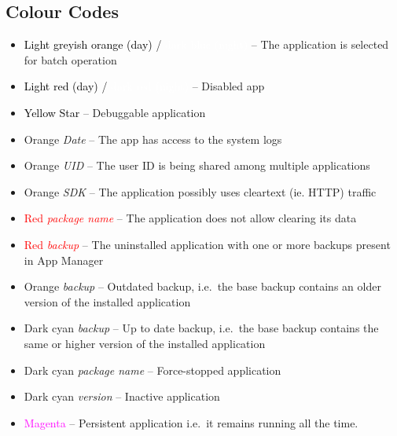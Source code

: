 \subsection{Colour Codes}\label{subsec:main-colour-codes} %
\begin{itemize}
    \item \colorbox{AMLightGreyishOrange}{\textcolor{black}{Light greyish orange (day)}} / \colorbox{AMDarkBlue}{
        \textcolor{white}{dark blue (night)}} -- The application is selected for batch operation
    \item \colorbox{AMLightRed}{\textcolor{black}{Light red (day)}} / \colorbox{AMVeryDarkRed}{\textcolor{white}
    {dark red (night)}} -- Disabled app
    \item \colorbox{AMYellow}{\textcolor{black}{Yellow Star}} -- Debuggable application
    \item \textcolor{AMOrange}{Orange \textit{Date}} -- The app has access to the system logs
    \item \textcolor{AMOrange}{Orange \textit{UID}} -- The user ID is being shared among multiple applications
    \item \textcolor{AMOrange}{Orange \textit{SDK}} -- The application possibly uses cleartext (ie. HTTP) traffic
    \item \textcolor{red}{Red \textit{package name}} -- The application does not allow clearing its data
    \item \textcolor{red}{Red \textit{backup}} -- The uninstalled application with one or more backups present in App
    Manager
    \item \textcolor{AMOrange}{Orange \textit{backup}} -- Outdated backup, i.e.\ the base backup contains an older
    version of the installed application
    \item \textcolor{AMDarkCyan}{Dark cyan \textit{backup}} -- Up to date backup, i.e.\ the base backup contains the
    same or higher version of the installed application
    \item \textcolor{AMDarkCyan}{Dark cyan \textit{package name}} -- Force-stopped application
    \item \textcolor{AMDarkCyan}{Dark cyan \textit{version}} -- Inactive application
    \item \textcolor{magenta}{Magenta} -- Persistent application i.e.\ it remains running all the time.
\end{itemize}

